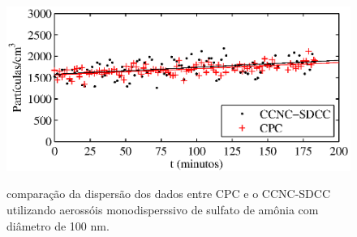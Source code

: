 \begin{figure}[hbt]
\begin{center}
\includegraphics[scale=0.9]{GraficosMatlab/dispersao.eps}\\
\end{center}
\caption{\label{dispersao}\hspace{-0.1em} compara\c{c}\~{a}o da dispers\~{a}o dos dados entre CPC e o CCNC-SDCC  utilizando aeross\'{o}is monodisperssivo de sulfato de am\^{o}nia com di\^{a}metro de 100 nm.}
\end{figure}



